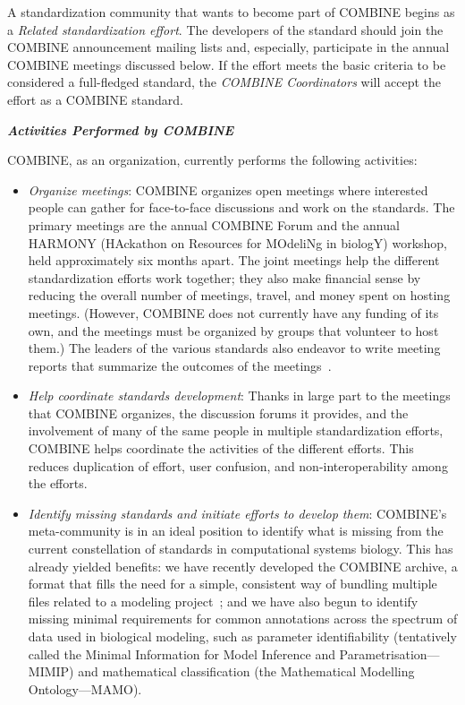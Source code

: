 A standardization community that wants to become part of COMBINE begins as a \emph{Related standardization effort}.  The developers of the standard should join the COMBINE announcement mailing lists and, especially, participate in the annual COMBINE meetings discussed below.  If the effort meets the basic criteria to be considered a full-fledged standard, the \emph{COMBINE Coordinators} will accept the effort as a COMBINE standard.


\textbf{\textsl{Activities Performed by COMBINE}}

COMBINE, as an organization, currently performs the following activities:
\vspace*{-1em}
\begin{itemize}

\item \emph{Organize meetings}: COMBINE organizes open meetings where interested people can gather for face-to-face discussions and work on the standards.  The primary meetings are the annual COMBINE Forum and the annual HARMONY (HAckathon on Resources for MOdeliNg in biologY) workshop, held approximately six months apart.  The joint meetings help the different standardization efforts work together; they also make financial sense by reducing the overall number of meetings, travel, and money spent on hosting meetings.  (However, COMBINE does not currently have any funding of its own, and the meetings must be organized by groups that volunteer to host them.)  The leaders of the various standards also endeavor to write meeting reports that summarize the outcomes of the meetings~\citep[e.g.,][]{le2011meeting, waltemath2014meeting}.

\item \emph{Help coordinate standards development}: Thanks in large part to the meetings that COMBINE organizes, the discussion forums it provides, and the involvement of many of the same people in multiple standardization efforts, COMBINE helps coordinate the activities of the different efforts.  This reduces duplication of effort, user confusion, and non-interoperability among the efforts.

\item \emph{Identify missing standards and initiate efforts to develop them}: COMBINE's meta-community is in an ideal position to identify what is missing from the current constellation of standards in computational systems biology.  This has already yielded benefits: we have recently developed the COMBINE archive, a format that fills the need for a simple, consistent way of bundling multiple files related to a modeling project~\cite[\url{http://co.mbine.org/standards/omex};][]{Bergmann2014combine}; and we have also begun to identify missing minimal requirements for common annotations across the spectrum of data used in biological modeling, such as parameter identifiability (tentatively called the Minimal Information for Model Inference and Parametrisation---MIMIP) and mathematical classification (the Mathematical Modelling Ontology---MAMO).


\end{itemize}
